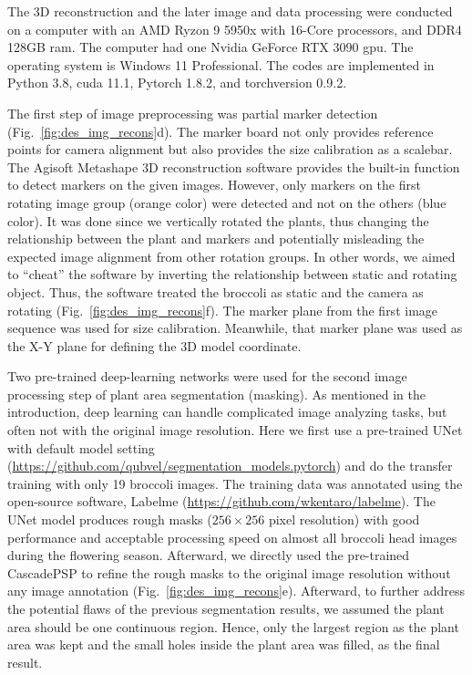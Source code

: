 The 3D reconstruction and the later image and data processing were conducted on a computer with an AMD Ryzon 9 5950x with 16-Core processors, and DDR4 128GB \gls{ram}. The computer had one Nvidia GeForce RTX 3090 \gls{gpu}. The operating system is Windows 11 Professional. The codes are implemented in Python 3.8, \gls{cuda} 11.1, Pytorch 1.8.2, and torchversion 0.9.2.

The first step of image preprocessing was partial marker detection (Fig.~\ref{fig:des_img_recons}d). The marker board not only provides reference points for camera alignment but also provides the size calibration as a scalebar. The Agisoft Metashape 3D reconstruction software provides the built-in function to detect markers on the given images. However, only markers on the first rotating image group (orange color) were detected and not on the others (blue color). It was done since we vertically rotated the plants, thus changing the relationship between the plant and markers and potentially misleading the expected image alignment from other rotation groups. In other words, we aimed to ``cheat'' the software by inverting the relationship between static and rotating object. Thus, the software treated the broccoli as static and the camera as rotating (Fig.~\ref{fig:des_img_recons}f). The marker plane from the first image sequence was used for size calibration. Meanwhile, that marker plane was used as the X-Y plane for defining the 3D model coordinate.

Two pre-trained deep-learning networks were used for the second image processing step of plant area segmentation (masking). As mentioned in the introduction, deep learning can handle complicated image analyzing tasks, but often not with the original image resolution. Here we first use a pre-trained UNet with default model setting (\url{https://github.com/qubvel/segmentation_models.pytorch}) and do the transfer training with only 19 broccoli images. The training data was annotated using the open-source software, Labelme (\url{https://github.com/wkentaro/labelme}). The UNet model produces rough masks ($256 \times 256$ pixel resolution) with good performance and acceptable processing speed on almost all broccoli head images during the flowering season. Afterward, we directly used the pre-trained CascadePSP \citep[\url{https://github.com/hkchengrex/CascadePSP}]{cheng_cascadepsp_2020} to refine the rough masks to the original image resolution without any image annotation (Fig.~\ref{fig:des_img_recons}e). Afterward, to further address the potential flaws of the previous segmentation results, we assumed the plant area should be one continuous region. Hence, only the largest region as the plant area was kept and the small holes inside the plant area was filled, as the final result.

